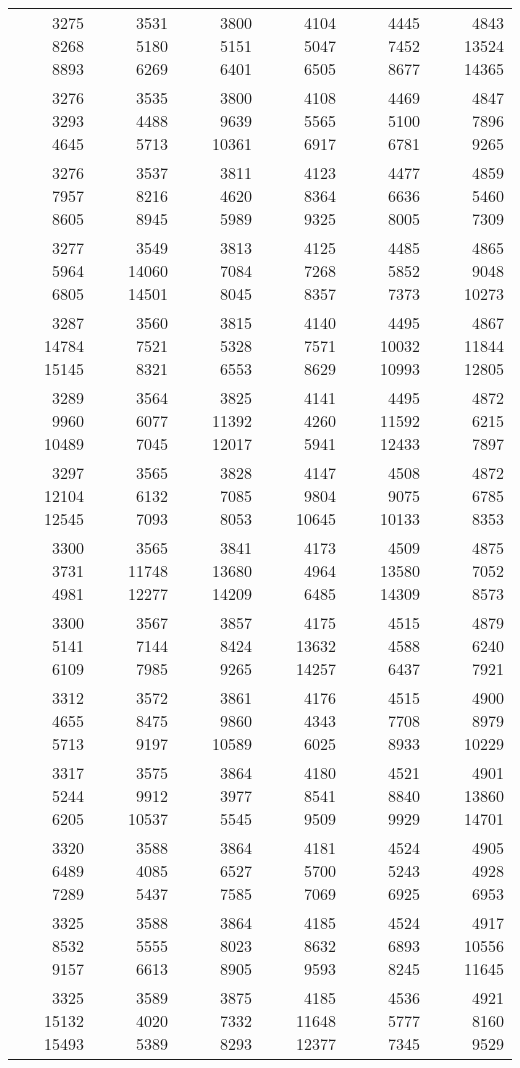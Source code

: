 \begin{center}
\begin{longtable}[c]{*{6}{r}}
3275 8268 8893&3531 5180 6269&3800 5151 6401&4104 5047 6505&4445 7452 8677&4843 13524 14365\\
3276 3293 4645&3535 4488 5713&3800 9639 10361&4108 5565 6917&4469 5100 6781&4847 7896 9265\\
3276 7957 8605&3537 8216 8945&3811 4620 5989&4123 8364 9325&4477 6636 8005&4859 5460 7309\\
3277 5964 6805&3549 14060 14501&3813 7084 8045&4125 7268 8357&4485 5852 7373&4865 9048 10273\\
3287 14784 15145&3560 7521 8321&3815 5328 6553&4140 7571 8629&4495 10032 10993&4867 11844 12805\\
3289 9960 10489&3564 6077 7045&3825 11392 12017&4141 4260 5941&4495 11592 12433&4872 6215 7897\\
3297 12104 12545&3565 6132 7093&3828 7085 8053&4147 9804 10645&4508 9075 10133&4872 6785 8353\\
3300 3731 4981&3565 11748 12277&3841 13680 14209&4173 4964 6485&4509 13580 14309&4875 7052 8573\\
3300 5141 6109&3567 7144 7985&3857 8424 9265&4175 13632 14257&4515 4588 6437&4879 6240 7921\\
3312 4655 5713&3572 8475 9197&3861 9860 10589&4176 4343 6025&4515 7708 8933&4900 8979 10229\\
3317 5244 6205&3575 9912 10537&3864 3977 5545&4180 8541 9509&4521 8840 9929&4901 13860 14701\\
3320 6489 7289&3588 4085 5437&3864 6527 7585&4181 5700 7069&4524 5243 6925&4905 4928 6953\\
3325 8532 9157&3588 5555 6613&3864 8023 8905&4185 8632 9593&4524 6893 8245&4917 10556 11645\\
3325 15132 15493&3589 4020 5389&3875 7332 8293&4185 11648 12377&4536 5777 7345&4921 8160 9529\\
\end{longtable}
\end{center}
\newpage
